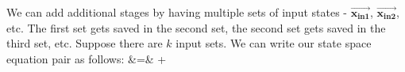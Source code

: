 We can add additional stages by having multiple sets of input states -
$\vec{\mathbf{x_{in1}}}$, $\vec{\mathbf{x_{in2}}}$, etc. The
first set gets saved in the second set, the second set gets saved in
the third set, etc.  Suppose there are $k$ input sets. We can write
our state space equation pair as follows:
\starteqnstar
{} &\hspace{-6pt}=\hspace{-6pt}&  
+ 
 \\
